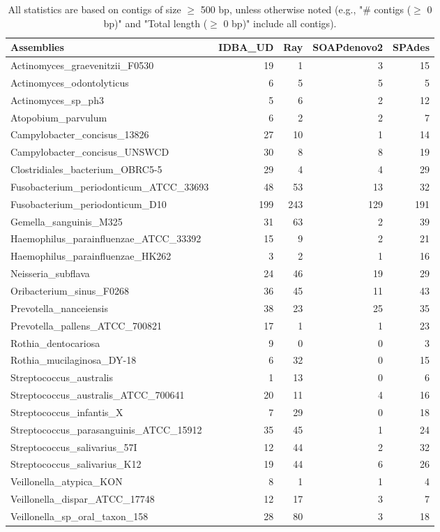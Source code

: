 \documentclass[12pt,a4paper]{article}
\begin{document}
\begin{table}[ht]
\begin{center}
\caption{All statistics are based on contigs of size $\geq$ 500 bp, unless otherwise noted (e.g., "\# contigs ($\geq$ 0 bp)" and "Total length ($\geq$ 0 bp)" include all contigs).}
\begin{tabular}{|l*{4}{|r}|}
\hline
Assemblies & IDBA\_UD & Ray & SOAPdenovo2 & SPAdes \\ \hline
Actinomyces\_graevenitzii\_F0530 & 19 & 1 & 3 & 15 \\ \hline
Actinomyces\_odontolyticus & 6 & 5 & 5 & 5 \\ \hline
Actinomyces\_sp\_ph3 & 5 & 6 & 2 & 12 \\ \hline
Atopobium\_parvulum & 6 & 2 & 2 & 7 \\ \hline
Campylobacter\_concisus\_13826 & 27 & 10 & 1 & 14 \\ \hline
Campylobacter\_concisus\_UNSWCD & 30 & 8 & 8 & 19 \\ \hline
Clostridiales\_bacterium\_OBRC5-5 & 29 & 4 & 4 & 29 \\ \hline
Fusobacterium\_periodonticum\_ATCC\_33693 & 48 & 53 & 13 & 32 \\ \hline
Fusobacterium\_periodonticum\_D10 & 199 & 243 & 129 & 191 \\ \hline
Gemella\_sanguinis\_M325 & 31 & 63 & 2 & 39 \\ \hline
Haemophilus\_parainfluenzae\_ATCC\_33392 & 15 & 9 & 2 & 21 \\ \hline
Haemophilus\_parainfluenzae\_HK262 & 3 & 2 & 1 & 16 \\ \hline
Neisseria\_subflava & 24 & 46 & 19 & 29 \\ \hline
Oribacterium\_sinus\_F0268 & 36 & 45 & 11 & 43 \\ \hline
Prevotella\_nanceiensis & 38 & 23 & 25 & 35 \\ \hline
Prevotella\_pallens\_ATCC\_700821 & 17 & 1 & 1 & 23 \\ \hline
Rothia\_dentocariosa & 9 & 0 & 0 & 3 \\ \hline
Rothia\_mucilaginosa\_DY-18 & 6 & 32 & 0 & 15 \\ \hline
Streptococcus\_australis & 1 & 13 & 0 & 6 \\ \hline
Streptococcus\_australis\_ATCC\_700641 & 20 & 11 & 4 & 16 \\ \hline
Streptococcus\_infantis\_X & 7 & 29 & 0 & 18 \\ \hline
Streptococcus\_parasanguinis\_ATCC\_15912 & 35 & 45 & 1 & 24 \\ \hline
Streptococcus\_salivarius\_57I & 12 & 44 & 2 & 32 \\ \hline
Streptococcus\_salivarius\_K12 & 19 & 44 & 6 & 26 \\ \hline
Veillonella\_atypica\_KON & 8 & 1 & 1 & 4 \\ \hline
Veillonella\_dispar\_ATCC\_17748 & 12 & 17 & 3 & 7 \\ \hline
Veillonella\_sp\_oral\_taxon\_158 & 28 & 80 & 3 & 18 \\ \hline
\end{tabular}
\end{center}
\end{table}
\end{document}
